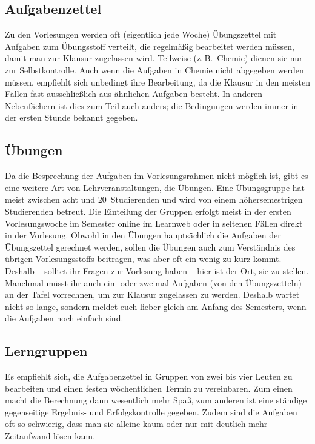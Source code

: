 \begin{multicols}{2}
\subsection{Aufgabenzettel}
Zu den Vorlesungen werden oft (eigentlich jede Woche) Übungszettel mit Aufgaben zum Übungsstoff verteilt, die regelmäßig bearbeitet werden müssen, damit man zur Klausur zugelassen wird.
Teilweise (z.\,B.\ Chemie) dienen sie nur zur Selbstkontrolle.
Auch wenn die Aufgaben in Chemie nicht abgegeben werden müssen, empfiehlt sich unbedingt ihre Bearbeitung, da die Klausur in den meisten Fällen fast ausschließlich aus ähnlichen Aufgaben besteht.
In anderen Nebenfächern ist dies zum Teil auch anders; die Bedingungen werden immer in der ersten Stunde bekannt gegeben.

\subsection{Übungen}
Da die Besprechung der Aufgaben im Vorlesungsrahmen nicht möglich ist, gibt es eine weitere Art von Lehrveranstaltungen, die Übungen.
Eine Übungsgruppe hat meist zwischen acht und 20~Studierenden und wird von einem höhersemestrigen Studierenden betreut.
Die Einteilung der Gruppen erfolgt meist in der ersten Vorlesungswoche im Semester online im Learnweb oder in seltenen Fällen direkt in der Vorlesung.
Obwohl in den Übungen hauptsächlich die Aufgaben der Übungszettel gerechnet werden, sollen die Übungen auch zum Verständnis des übrigen Vorlesungsstoffs beitragen, was aber oft ein wenig zu kurz kommt.
Deshalb -- solltet ihr Fragen zur Vorlesung haben -- hier ist der Ort, sie zu stellen.
Manchmal müsst ihr auch ein- oder zweimal Aufgaben (von den Übungszetteln) an der Tafel vorrechnen, um zur Klausur zugelassen zu werden.
Deshalb wartet nicht so lange, sondern meldet euch lieber gleich am Anfang des Semesters, wenn die Aufgaben noch einfach sind.

\subsection{Lerngruppen}
Es empfiehlt sich, die Aufgabenzettel in Gruppen von zwei bis vier Leuten zu bearbeiten und einen festen wöchentlichen Termin zu vereinbaren.
Zum einen macht die Berechnung dann wesentlich mehr Spaß, zum anderen ist eine ständige gegenseitige Ergebnis- und Erfolgskontrolle gegeben.
Zudem sind die Aufgaben oft so schwierig, dass man sie alleine kaum oder nur mit deutlich mehr Zeitaufwand lösen kann.


\end{multicols}
